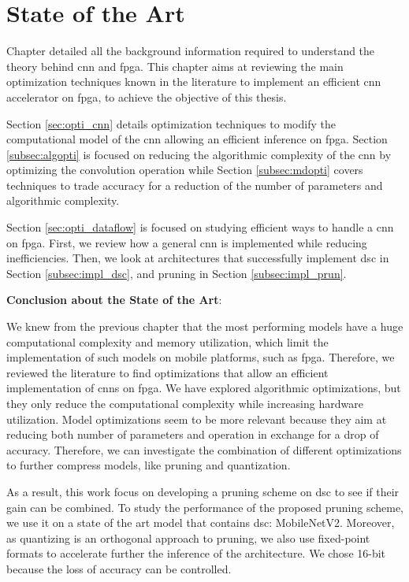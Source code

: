 \chapter{State of the Art} \label{chap:sota}
Chapter  detailed all the background information required to understand the theory behind \acrshort{cnn} and \acrshort{fpga}. This chapter aims at reviewing the main optimization techniques known in the literature to implement an efficient \acrshort{cnn} accelerator on \acrshort{fpga}, to achieve the objective of this thesis.

Section \ref{sec:opti_cnn} details optimization techniques to modify the computational model of the \acrshort{cnn} allowing an efficient inference on \acrshort{fpga}. Section \ref{subsec:algopti} is focused on reducing the algorithmic complexity of the \acrshort{cnn} by optimizing the convolution operation while Section \ref{subsec:mdopti} covers techniques to trade accuracy for a reduction of the number of parameters and algorithmic complexity.

Section \ref{sec:opti_dataflow} is focused on studying efficient ways to handle a \acrshort{cnn} on \acrshort{fpga}. First, we review how a general \acrshort{cnn} is implemented while reducing inefficiencies. Then, we look at architectures that successfully implement \acrshort{dsc} in Section \ref{subsec:impl_dsc}, and pruning in Section \ref{subsec:impl_prun}.

%

%
\begin{tcolorbox}
    \textbf{Conclusion about the State of the Art}:

    We knew from the previous chapter that the most performing models have a huge computational complexity and memory utilization, which limit the implementation of such models on mobile platforms, such as \acrshort{fpga}. Therefore, we reviewed the literature to find optimizations that allow an efficient implementation of \acrshort{cnn}s on \acrshort{fpga}. We have explored algorithmic optimizations, but they only reduce the computational complexity while increasing hardware utilization. Model optimizations seem to be more relevant because they aim at reducing both number of parameters and operation in exchange for a drop of accuracy. Therefore, we can investigate the combination of different optimizations to further compress models, like pruning and quantization. 
    
    As a result, this work focus on developing a pruning scheme on \acrshort{dsc} to see if their gain can be combined. To study the performance of the proposed pruning scheme, we use it on a state of the art model that contains \acrshort{dsc}: MobileNetV2. Moreover, as quantizing is an orthogonal approach to pruning, we also use fixed-point formats to accelerate further the inference of the architecture. We chose 16-bit because the loss of accuracy can be controlled.
\end{tcolorbox}
\afterpage{\blankpage}
\cleardoublepage
\newpage
